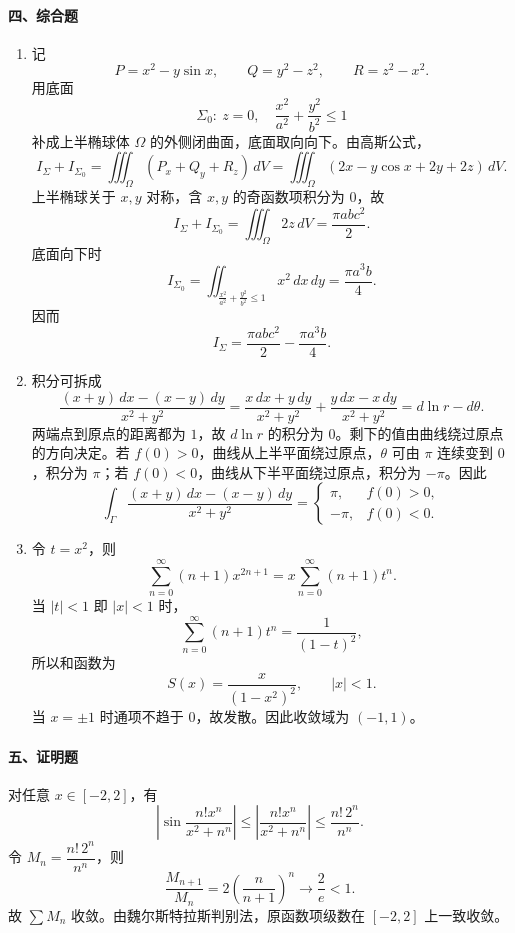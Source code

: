 \paragraph*{四、综合题}
\begin{enumerate}
  \item 记
  \[
    P=x^2-y\sin x,\qquad Q=y^2-z^2,\qquad R=z^2-x^2.
  \]
  用底面
  \[
    \Sigma_0:\ z=0,\quad \frac{x^2}{a^2}+\frac{y^2}{b^2}\le1
  \]
  补成上半椭球体 $\Omega$ 的外侧闭曲面，底面取向向下。由高斯公式，
  \[
    I_\Sigma+I_{\Sigma_0}
    =\iiint_\Omega (P_x+Q_y+R_z)\,dV
    =\iiint_\Omega (2x-y\cos x+2y+2z)\,dV.
  \]
  上半椭球关于 $x,y$ 对称，含 $x,y$ 的奇函数项积分为 $0$，故
  \[
    I_\Sigma+I_{\Sigma_0}=\iiint_\Omega 2z\,dV
    =\frac{\pi ab c^2}{2}.
  \]
  底面向下时
  \[
    I_{\Sigma_0}=\iint_{\frac{x^2}{a^2}+\frac{y^2}{b^2}\le1}x^2\,dx\,dy
    =\frac{\pi a^3b}{4}.
  \]
  因而
  \[
    I_\Sigma=\frac{\pi ab c^2}{2}-\frac{\pi a^3b}{4}.
  \]

  \item 积分可拆成
  \[
    \frac{(x+y)\,dx-(x-y)\,dy}{x^2+y^2}
    =\frac{x\,dx+y\,dy}{x^2+y^2}
    +\frac{y\,dx-x\,dy}{x^2+y^2}
    =d\ln r-d\theta.
  \]
  两端点到原点的距离都为 $1$，故 $d\ln r$ 的积分为 $0$。剩下的值由曲线绕过原点的方向决定。若
  $f(0)>0$，曲线从上半平面绕过原点，$\theta$ 可由 $\pi$ 连续变到 $0$，积分为 $\pi$；若
  $f(0)<0$，曲线从下半平面绕过原点，积分为 $-\pi$。因此
  \[
    \int_\Gamma
    \frac{(x+y)\,dx-(x-y)\,dy}{x^2+y^2}
    =
    \begin{cases}
      \pi, & f(0)>0,\\
      -\pi, & f(0)<0.
    \end{cases}
  \]

  \item 令 $t=x^2$，则
  \[
    \sum_{n=0}^{\infty}(n+1)x^{2n+1}
    =x\sum_{n=0}^{\infty}(n+1)t^n.
  \]
  当 $|t|<1$ 即 $|x|<1$ 时，
  \[
    \sum_{n=0}^{\infty}(n+1)t^n=\frac{1}{(1-t)^2},
  \]
  所以和函数为
  \[
    S(x)=\frac{x}{(1-x^2)^2},\qquad |x|<1.
  \]
  当 $x=\pm1$ 时通项不趋于 $0$，故发散。因此收敛域为 $(-1,1)$。
\end{enumerate}

\paragraph*{五、证明题}
对任意 $x\in[-2,2]$，有
\[
  \left|\sin\frac{n!x^n}{x^2+n^n}\right|
  \le
  \left|\frac{n!x^n}{x^2+n^n}\right|
  \le
  \frac{n!\,2^n}{n^n}.
\]
令 $M_n=\dfrac{n!\,2^n}{n^n}$，则
\[
  \frac{M_{n+1}}{M_n}
  =2\left(\frac{n}{n+1}\right)^n\longrightarrow \frac{2}{e}<1.
\]
故 $\sum M_n$ 收敛。由魏尔斯特拉斯判别法，原函数项级数在 $[-2,2]$ 上一致收敛。

